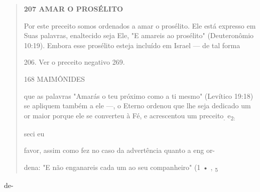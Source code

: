 \begin{quote}
\textbf{207 AMAR O PROSÉLITO}

Por este preceito somos ordenados a amar o prosélito. Ele está ex­presso
em Suas palavras, enaltecido seja Ele, "E amareis ao prosélito"
(Deute­ronômio 10:19). Embora esse prosélito esteja incluído em Israel
--- de tal forma

206. Ver o preceito negativo 269.

168 MAIMÔNIDES

que as palavras "Amarás o teu próximo como a ti mesmo" (Levítico 19:18)
se apliquem também a ele ---, o Eterno ordenou que lhe seja dedicado um
or maior porque ele se converteu à Fé, e acrescentou um
preceito\textsubscript{.} e\textsubscript{2:}

seci eu

favor, assim como fez no caso da advertência quanto a eng or-

dena: "E não enganareis cada um ao seu companheiro" (1 • ,
\textsubscript{5}
\end{quote}

de-

